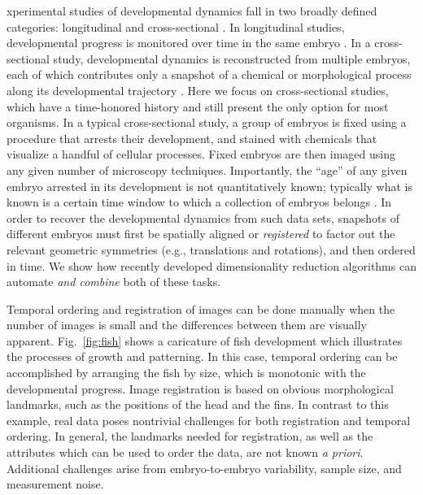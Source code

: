 \documentclass{pnastwo}
\newcommand{\fig}[0]{Fig.}
\begin{document}
\begin{article}
xperimental studies of developmental dynamics fall in two broadly defined categories: longitudinal and cross-sectional \cite{diggle2002analysis}.
%
In longitudinal studies, developmental progress is monitored over time in the same embryo \cite{roelens2013live, keller2013imaging}.
%
In a cross-sectional study, developmental dynamics is reconstructed from multiple embryos, each of which contributes only a snapshot of a chemical or morphological process along its developmental trajectory \cite{jaeger2004dynamic, peter2011gene, fowlkes2008quantitative}.
%
Here we focus on cross-sectional studies, which have a time-honored history and still present the only option for most organisms.
%
In a typical cross-sectional study, a group of embryos is fixed using a procedure that arrests their development, and stained with chemicals that visualize a handful of cellular processes.
%
Fixed embryos are then imaged using any given number of microscopy techniques.
%
Importantly, the ``age'' of any given embryo arrested in its development is not quantitatively known; typically what is known is
a certain time window to which a collection of embryos belongs \cite{ng2012large, richardson2014emage, castro2009automatic}.
%
In order to recover the developmental dynamics from such data sets, snapshots of different embryos must first be spatially aligned or {\em registered} to factor out the relevant geometric symmetries (e.g., translations and rotations), and then ordered in time.
%
We show how recently developed dimensionality reduction algorithms can automate {\it and combine} both of these tasks.

Temporal ordering and registration of images can be done manually
when the number of images is small and the differences between them are visually apparent. 
%
\fig~\ref{fig:fish} shows a caricature of fish development which illustrates the processes of growth and patterning.
%
In this case, temporal ordering can be accomplished by arranging the fish by size, which is monotonic with the developmental progress.
%
Image registration is based on obvious morphological landmarks, such as the positions of the head and the fins.
%
In contrast to this example, real data poses nontrivial challenges for both registration and temporal ordering.
%
In general, the landmarks needed for registration, as well as the attributes which can be used to order the data, are not known {\it a priori}.
%
Additional challenges arise from embryo-to-embryo variability, sample size, and measurement noise.


\end{article}
\end{document}
